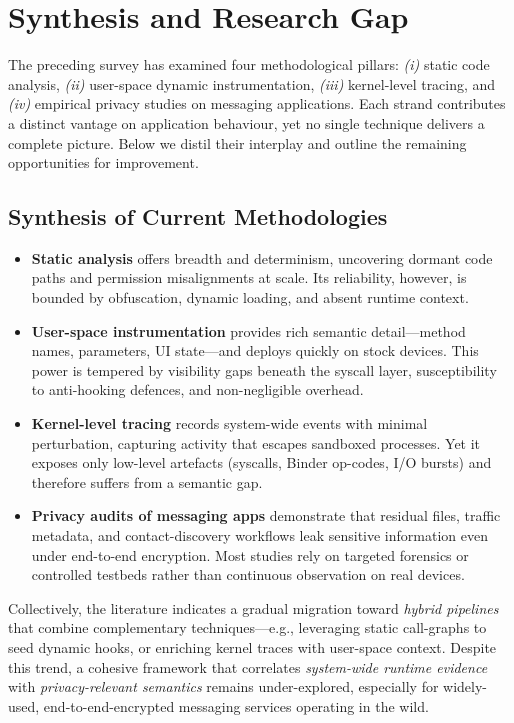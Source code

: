 \documentclass[a4paper,12pt]{report}
\begin{document}
\section{Synthesis and Research Gap}\label{sec:rw:gap}

The preceding survey has examined four methodological pillars: \emph{(i)} static code analysis, \emph{(ii)} user-space dynamic instrumentation, \emph{(iii)} kernel-level tracing, and \emph{(iv)} empirical privacy studies on messaging applications.  Each strand contributes a distinct vantage on application behaviour, yet no single technique delivers a complete picture.  Below we distil their interplay and outline the remaining opportunities for improvement.

\subsection*{Synthesis of Current Methodologies}
\begin{itemize}
\item \textbf{Static analysis} offers breadth and determinism, uncovering dormant code paths and permission misalignments at scale.  Its reliability, however, is bounded by obfuscation, dynamic loading, and absent runtime context.
\item \textbf{User-space instrumentation} provides rich semantic detail—method names, parameters, UI state—and deploys quickly on stock devices.  This power is tempered by visibility gaps beneath the syscall layer, susceptibility to anti-hooking defences, and non-negligible overhead.
\item \textbf{Kernel-level tracing} records system-wide events with minimal perturbation, capturing activity that escapes sandboxed processes.  Yet it exposes only low-level artefacts (syscalls, Binder op-codes, I/O bursts) and therefore suffers from a semantic gap.
\item \textbf{Privacy audits of messaging apps} demonstrate that residual files, traffic metadata, and contact-discovery workflows leak sensitive information even under end-to-end encryption.  Most studies rely on targeted forensics or controlled testbeds rather than continuous observation on real devices.
\end{itemize}

Collectively, the literature indicates a gradual migration toward \emph{hybrid pipelines} that combine complementary techniques—e.g., leveraging static call-graphs to seed dynamic hooks, or enriching kernel traces with user-space context.  Despite this trend, a cohesive framework that correlates \emph{system-wide runtime evidence} with \emph{privacy-relevant semantics} remains under-explored, especially for widely-used, end-to-end-encrypted messaging services operating in the wild.
\end{document}
